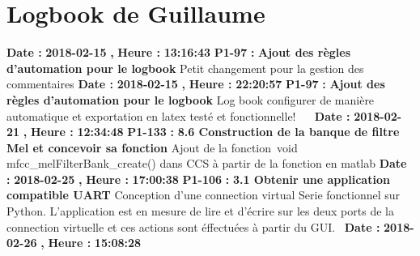 \documentclass{article}%
\begin{document}
\section{Logbook de Guillaume}%
\textbf{Date : }%
\textbf{2018{-}02{-}15}%
\textbf{,}%
\textbf{ Heure : }%
\textbf{13:16:43}%
\newline%
%
\textbf{P1{-}97 }%
\textbf{ : }%
\textbf{ Ajout des règles d'automation pour le logbook}%
\newline%
\newline%
%
Petit changement pour la gestion des commentaires\newline%
\newline%
%
\textbf{Date : }%
\textbf{2018{-}02{-}15}%
\textbf{,}%
\textbf{ Heure : }%
\textbf{22:20:57}%
\newline%
%
\textbf{P1{-}97 }%
\textbf{ : }%
\textbf{ Ajout des règles d'automation pour le logbook}%
\newline%
\newline%
%
Log book configurer de manière automatique et exportation en latex testé et fonctionnelle!~\newline%
~\newline%
\newline%
%
\textbf{Date : }%
\textbf{2018{-}02{-}21}%
\textbf{,}%
\textbf{ Heure : }%
\textbf{12:34:48}%
\newline%
%
\textbf{P1{-}133 }%
\textbf{ : }%
\textbf{ 8.6 Construction de la banque de filtre Mel et concevoir sa fonction}%
\newline%
\newline%
%
Ajout de la fonction~void mfcc\_melFilterBank\_create() dans CCS à partir de la fonction en matlab\newline%
\newline%
%
\textbf{Date : }%
\textbf{2018{-}02{-}25}%
\textbf{,}%
\textbf{ Heure : }%
\textbf{17:00:38}%
\newline%
%
\textbf{P1{-}106 }%
\textbf{ : }%
\textbf{ 3.1 Obtenir une application compatible UART}%
\newline%
\newline%
%
Conception d'une connection virtual Serie fonctionnel sur Python.\newline%
L'application est en mesure de lire et d'écrire sur les deux ports de la connection virtuelle et ces actions sont éffectuées à partir du GUI.~\newline%
\newline%
%
\textbf{Date : }%
\textbf{2018{-}02{-}26}%
\textbf{,}%
\textbf{ Heure : }%
\textbf{15:08:28}%
\end{document}

